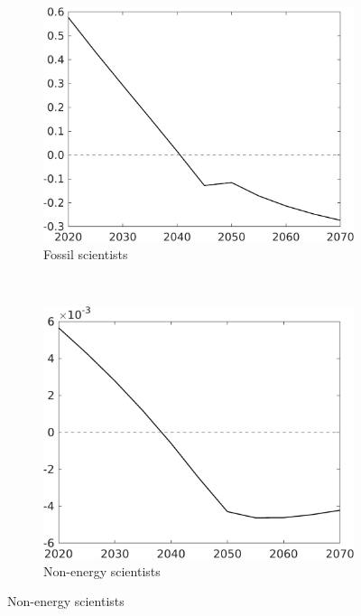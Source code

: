 \begin{figure}[h!!!]
\vspace{3mm}
	\begin{subfigure}{0.4\textwidth}
		\caption{Fossil scientists}
		\includegraphics[width=1\textwidth]{../../codding_model/own_basedOnFried/optimalPol_010922_revision/figures/all_13Sept22_Tplus30/sff_OPT_T_NoTaus_COMPtaulPer_regime4_spillover0_knspil0_noskill0_sep0_xgrowth0_PV1_etaa0.79.png}
	\end{subfigure}
\begin{minipage}[]{0.1\textwidth}
	\
\end{minipage}
	\begin{subfigure}{0.4\textwidth}
		\caption{Non-energy scientists}
		\includegraphics[width=1\textwidth]{../../codding_model/own_basedOnFried/optimalPol_010922_revision/figures/all_13Sept22_Tplus30/sn_OPT_T_NoTaus_COMPtaulPer_regime4_spillover0_knspil0_noskill0_sep0_xgrowth0_PV1_etaa0.79.png}
	\end{subfigure}


\end{figure}
